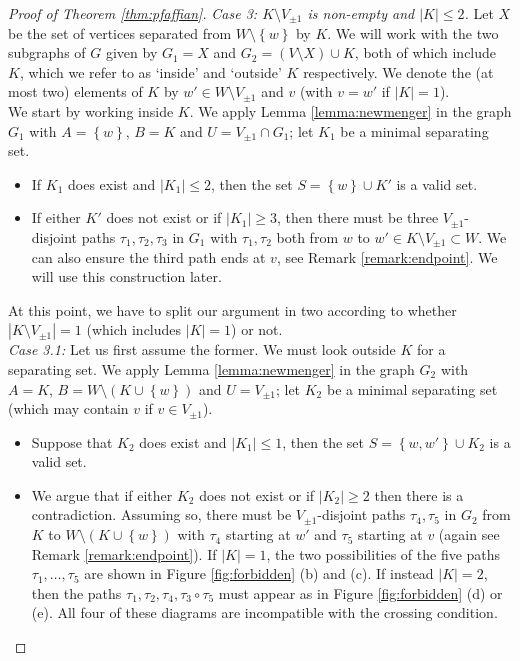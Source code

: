 \documentclass{article}
\numberwithin{equation}{section}
\theoremstyle{definition}
\theoremstyle{definition}
\theoremstyle{remark}
\newcommand{\Vis}{V_{\mathrm{Ising}}}
\renewcommand{\Vis}{V_{\pm 1}}
\begin{document}
\begin{proof}[Proof of Theorem \ref{thm:pfaffian}]
	\noindent\emph{Case 3: $K \setminus \Vis$ is non-empty and $|K| \leq 2$.} Let $X$ be the set of vertices separated from $W \setminus \left\{ w \right\}$ by $K$. We will work with the two subgraphs of $G$ given by $G_1 = X$ and $G_2 = (V \setminus X) \cup K$, both of which include $K$, which we refer to as `inside' and `outside' $K$ respectively. We denote the (at most two) elements of $K$ by $w' \in W \setminus \Vis$ and $v$ (with $v = w'$ if $|K| = 1$).
	\\[1em]
	\noindent We start by working inside $K$. We apply Lemma \ref{lemma:newmenger} in the graph $G_1$ with $A = \left\{ w \right\} $, $B = K$ and $U = \Vis \cap G_1$; let $K_1$ be a minimal separating set.
	\begin{itemize}
		\item If $K_1$ does exist and $|K_1| \leq 2$, then the set $S = \left\{ w \right\} \cup K'$ is a valid set. 
		\item If either $K'$ does not exist or if $|K_1| \geq 3$, then there must be three $\Vis$-disjoint paths $\tau_1,\tau_2,\tau_3$ in $G_1$ with $\tau_1,\tau_2$ both from $w$ to $w' \in K \setminus \Vis \subset W$. We can also ensure the third path ends at $v$, see Remark \ref{remark:endpoint}. We will use this construction later.
	\end{itemize}
	At this point, we have to split our argument in two according to whether $|K \setminus \Vis| = 1$ (which includes $|K| = 1$) or not. 
	\\[1em]
	\noindent\emph{Case 3.1: }Let us first assume the former.
	We must look outside $K$ for a separating set. We apply Lemma \ref{lemma:newmenger} in the graph $G_2$ with $A = K$, $B = W \setminus (K \cup \left\{ w \right\})$ and $U = \Vis$; let $K_2$ be a minimal separating set (which may contain $v$ if $v \in \Vis$).
	\begin{itemize}
		\item Suppose that $K_2$ does exist and $|K_1| \leq 1$, then the set $S = \left\{ w,w' \right\} \cup K_2$ is a valid set. 
		\item We argue that if either $K_2$ does not exist or if $|K_2| \geq 2$ then there is a contradiction. Assuming so, there must be $\Vis$-disjoint paths $\tau_4,\tau_5$ in $G_2$ from $K$ to $W \setminus (K \cup \left\{ w \right\})$ with $\tau_4$ starting at $w'$ and $\tau_5$ starting at $v$ (again see Remark \ref{remark:endpoint}).
			If $|K| = 1$, the two possibilities of the five paths $\tau_1,\ldots,\tau_5$ are shown in Figure \ref{fig:forbidden} (b) and (c).
		If instead $|K| = 2$, then the paths $\tau_1,\tau_2,\tau_4,\tau_3 \circ \tau_5$ must appear as in Figure \ref{fig:forbidden} (d) or (e). All four of these diagrams are incompatible with the crossing condition.
	\end{itemize}
	

\end{proof}
\end{document}
